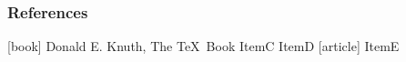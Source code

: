 \documentclass[12pt,ngerman]{beamer}
\begin{document}
\begin{frame}
\frametitle{}

\cite{Knuth}

\end{frame}

\begin{frame}
\frametitle{References}

\begin{thebibliography}{9}
[book]
 Donald E. Knuth, The \TeX\ Book
 ItemC
 ItemD
[article]
 ItemE
\end{thebibliography}


\end{frame}
\end{document}
